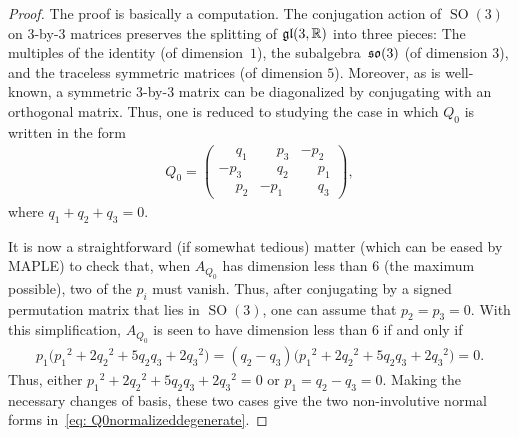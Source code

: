 \documentclass[11pt]{article}
\numberwithin{equation}{section}
\newcommand{\bbR}{{\mathbb R}}
\newcommand{\SO}{\operatorname{SO}}
\newcommand{\euso}{\operatorname{\frak{so}}}
\newcommand{\eugl}{\operatorname{\frak{gl}}}
\newcommand{\phm}{\phantom{-}}
\begin{document}
\begin{proof}
The proof is basically a computation. The conjugation action of $\SO(3)$
on $3$-by-$3$ mat\-rices preserves the splitting of $\eugl(3,\bbR)$
into three pieces: The multiples of the identity (of dimension~$1$),
the subalgebra~$\euso(3)$ (of dimension $3$),
and the traceless symmetric matrices (of dimension $5$).
Moreover, as is well-known, a symmetric $3$-by-$3$ matrix can be
diagonalized by conjugating with an orthogonal matrix. Thus, one
is reduced to studying the case in which $Q_0$ is written in the form
\begin{gather}\label{eq: Q0normalized}
Q_0 = \begin{pmatrix}\phm q_1&\phm p_3&-p_2\\
 -p_3&\phm q_2&\phm p_1\\
 \phm p_2&-p_1&\phm q_3\end{pmatrix},
\end{gather}
where $q_1+q_2+q_3 = 0$.

It is now a straightforward (if somewhat tedious) matter
(which can be eased by MAPLE) to check that, when $A_{Q_0}$
has dimension less than $6$ (the maximum possible),
two of the $p_i$ must vanish. Thus, after conjugating by
a signed permutation matrix that lies in $\SO(3)$,
one can assume that $p_2=p_3=0$.
With this simplification, $A_{Q_0}$ is seen to have dimension
less than $6$ if and only if
\begin{gather*}
p_1 \big({p_1}^2 + 2{q_2}^2 + 5q_2q_3 + 2{q_3}^2\big) =
(q_2 - q_3) \big({p_1}^2 + 2{q_2}^2 + 5q_2q_3 + 2{q_3}^2\big) = 0.
\end{gather*}
Thus, either ${p_1}^2 + 2{q_2}^2 + 5q_2q_3 + 2{q_3}^2=0$ or $p_1=q_2-q_3=0$.
Making the necessary changes of basis,
these two cases give the two non-involutive normal forms
in~\eqref{eq: Q0normalizeddegenerate}.


\end{proof}
\end{document}
